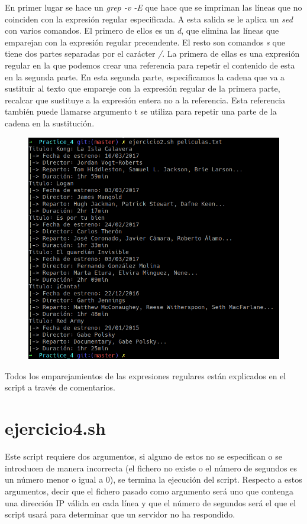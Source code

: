 \documentclass[12pt,a4paper]{article}
\begin{document}
En primer lugar se hace un \emph{grep -v -E} que hace que se impriman las líneas que no coinciden con la expresión regular especificada. A esta salida se le aplica un \emph{sed} con varios comandos. El primero de ellos es un \emph{d}, que elimina las líneas que emparejan con la expresión regular precendente. El resto son comandos \emph{s} que tiene dos partes separadas por el carácter \emph{/}. La primera de ellas es una expresión regular en la que podemos crear una referencia para repetir el contenido de esta en la segunda parte. En esta segunda parte, especificamos la cadena que va a sustituir al texto que empareje con la expresión regular de la primera parte, recalcar que sustituye a la expresión entera no a la referencia. Esta referencia también puede llamarse argumento t se utiliza para repetir una parte de la cadena en la sustitución.

\begin{figure}[ht]
	\centering
	\includegraphics[width=1\textwidth]{images/ejercicio2.png}
\end{figure}

Todos los emparejamientos de las expresiones regulares están explicados en el script a través de comentarios.

\newpage

\section{ejercicio4.sh}
Este script requiere dos argumentos, si alguno de estos no se especifican o se introducen de manera incorrecta (el fichero no existe o el número de segundos es un número menor o igual a 0), se termina la ejecución del script. Respecto a estos argumentos, decir que el fichero pasado como argumento será uno que contenga una dirección IP válida en cada línea y que el número de segundos será el que el script usará para determinar que un servidor no ha respondido.
\end{document}
